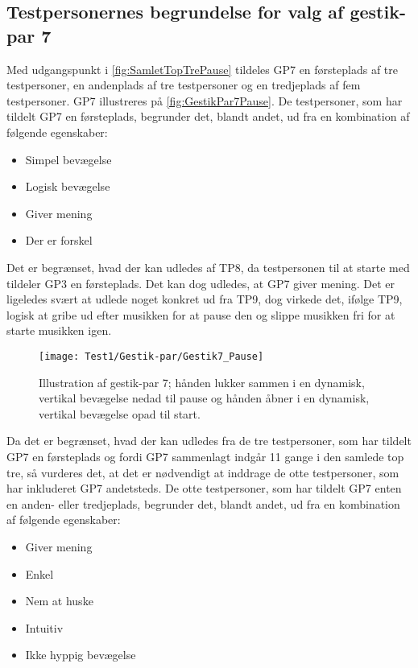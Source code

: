 \subsection{Testpersonernes begrundelse for valg af gestik-par 7}
\label{TestresultaterValgAfGestikkerBegrundelseGP7Pause}
%
Med udgangspunkt i \autoref{fig:SamletTopTrePause} tildeles GP7 en førsteplads af tre testpersoner, en andenplads af tre testpersoner og en tredjeplads af fem testpersoner. GP7 illustreres på \autoref{fig:GestikPar7Pause}. De testpersoner, som har tildelt GP7 en førsteplads, begrunder det, blandt andet, ud fra en kombination af følgende egenskaber: 
%
\begin{multicols}{3}
    \begin{itemize}
        \item Simpel bevægelse
        \item Logisk bevægelse
        \item Giver mening
        \item Der er forskel 
\end{itemize}
\end{multicols}
\noindent
%
Det er begrænset, hvad der kan udledes af TP8, da testpersonen til at starte med tildeler GP3 en førsteplads. Det kan dog udledes, at GP7 giver mening. Det er ligeledes svært at udlede noget konkret ud fra TP9, dog virkede det, ifølge TP9, logisk at gribe ud efter musikken for at pause den og slippe musikken fri for at starte musikken igen.
\newpage
%
\begin{figure}[H]
	\centering
	\texttt{[image: Test1/Gestik-par/Gestik7\_Pause]}
	\caption{Illustration af gestik-par 7; hånden lukker sammen i en dynamisk, vertikal bevægelse nedad til pause og hånden åbner i en dynamisk, vertikal bevægelse opad til start.}
	\label{fig:GestikPar7Pause}
\end{figure}
\noindent
%
Da det er begrænset, hvad der kan udledes fra de tre testpersoner, som har tildelt GP7 en førsteplads og fordi GP7 sammenlagt indgår 11 gange i den samlede top tre, så vurderes det, at det er nødvendigt at inddrage de otte testpersoner, som har inkluderet GP7 andetsteds. De otte testpersoner, som har tildelt GP7 enten en anden- eller tredjeplads, begrunder det, blandt andet, ud fra en kombination af følgende egenskaber: 
%
\begin{multicols}{3}
    \begin{itemize}
        \item Giver mening
        \item Enkel
        \item Nem at huske
        \item Intuitiv
        \item Ikke hyppig bevægelse
\end{itemize}
\end{multicols}
